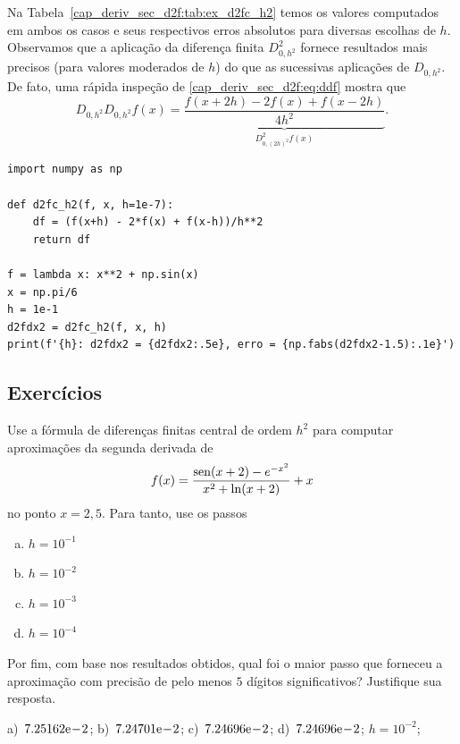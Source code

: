 \begin{ex}
Na Tabela~\ref{cap_deriv_sec_d2f:tab:ex_d2fc_h2} temos os valores computados em ambos os casos e seus respectivos erros absolutos para diversas escolhas de $h$. Observamos que a aplicação da diferença finita $D^2_{0,h^2}$ fornece resultados mais precisos (para valores moderados de $h$) do que as sucessivas aplicações de $D_{0,h^2}$. De fato, uma rápida inspeção de \eqref{cap_deriv_sec_d2f:eq:ddf} mostra que
\begin{equation}
  D_{0,h^2}D_{0,h^2}f(x) = \underbrace{\frac{f(x+2h) - 2f(x) + f(x-2h)}{4h^2}}_{D^2_{0,(2h)^2}f(x)}.
\end{equation}

\begin{lstlisting}[caption=d2fc\_h2.py]
import numpy as np

def d2fc_h2(f, x, h=1e-7):
    df = (f(x+h) - 2*f(x) + f(x-h))/h**2
    return df

f = lambda x: x**2 + np.sin(x)
x = np.pi/6
h = 1e-1
d2fdx2 = d2fc_h2(f, x, h)
print(f'{h}: d2fdx2 = {d2fdx2:.5e}, erro = {np.fabs(d2fdx2-1.5):.1e}')
\end{lstlisting}
\end{ex}

\subsection*{Exercícios}

\begin{exer}\label{exer:d2fc_fun}
  Use a fórmula de diferenças finitas central de ordem $h^2$ para computar aproximações da segunda derivada de
  \begin{equation}
    f(x) = \frac{\operatorname{sen}(x+2) - e^{-x^2}}{x^2 + \ln(x+2)}+x
  \end{equation}
no ponto $x=2,5$. Para tanto, use os passos
\begin{enumerate}[a)]
\item $h=10^{-1}$
\item $h=10^{-2}$
\item $h=10^{-3}$
\item $h=10^{-4}$
\end{enumerate}
Por fim, com base nos resultados obtidos, qual foi o maior passo que forneceu a aproximação com precisão de pelo menos $5$ dígitos significativos? Justifique sua resposta.
\end{exer}
\begin{resp}
  a)~$7.25162\mathrm{e}\!-\!2$; b)~$7.24701\mathrm{e}\!-\!2$; c)~$7.24696\mathrm{e}\!-\!2$; d)~$7.24696\mathrm{e}\!-\!2$; $h=10^{-2}$;
\end{resp}

